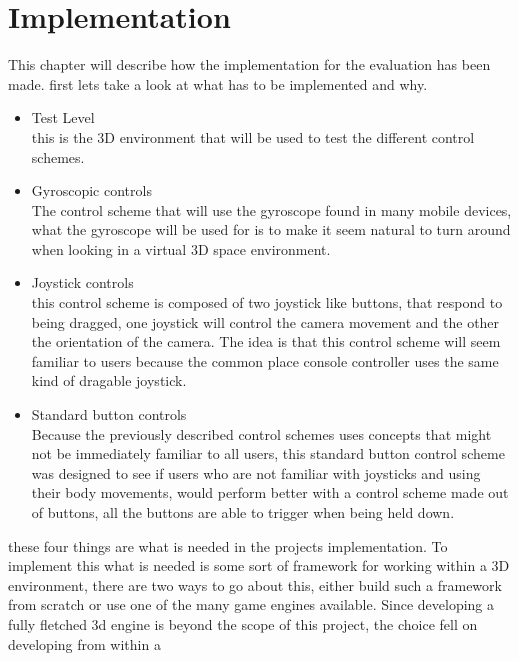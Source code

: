 \chapter{Implementation}
This chapter will describe how the implementation for the evaluation has been made. first lets take a look at what has to be implemented and why.
\begin{itemize}
\item Test Level\\
this is the 3D environment that will be used to test the different control schemes. 
\item Gyroscopic controls\\
The control scheme that will use the gyroscope found in many mobile devices, what the gyroscope will be used for is to make it seem natural to turn around when looking in a virtual 3D space environment. 
\item Joystick controls\\
this control scheme is composed of two joystick like buttons, that respond to being dragged, one joystick will control the camera movement and the other the orientation of the camera. The idea is that this control scheme will seem familiar%
to users because the common place console controller uses the same kind of dragable joystick.
\item Standard button controls\\
Because the previously described control schemes uses concepts that might not be immediately familiar to all users, this standard button control scheme was designed to see if users who are not familiar with joysticks and using their body movements, would perform better with a control scheme made out of buttons, all the buttons are able to trigger when being held down.
\end{itemize}
these four things are what is needed in the projects implementation. To implement this what is needed is some sort of framework for working within a 3D environment, there are two ways to go about this, either build such a framework from scratch or use one of the many game engines available. Since developing a fully fletched 3d engine is beyond the scope of this project, the choice fell on developing from within a